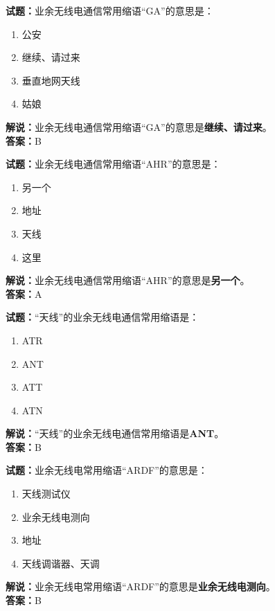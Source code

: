 \documentclass{ctexbook}
\begin{document}
\bigskip


\noindent\textbf{试题：}业余无线电通信常用缩语“GA”的意思是：
\begin{enumerate}[leftmargin=3em]
\item 公安
\item 继续、请过来
\item 垂直地网天线
\item 姑娘
\end{enumerate}
\noindent\textbf{解说：}业余无线电通信常用缩语“GA”的意思是\textbf{继续、请过来}。\\\noindent\textbf{答案：}B



\bigskip


\noindent\textbf{试题：}业余无线电通信常用缩语“AHR”的意思是：
\begin{enumerate}[leftmargin=3em]
\item 另一个
\item 地址
\item 天线
\item 这里
\end{enumerate}
\noindent\textbf{解说：}业余无线电通信常用缩语“AHR”的意思是\textbf{另一个}。\\\noindent\textbf{答案：}A

\bigskip


\noindent\textbf{试题：}“天线”的业余无线电通信常用缩语是：
\begin{enumerate}[leftmargin=3em]
\item ATR
\item ANT
\item ATT
\item ATN
\end{enumerate}
\noindent\textbf{解说：}“天线”的业余无线电通信常用缩语是\textbf{ANT}。\\\noindent\textbf{答案：}B



\bigskip


\noindent\textbf{试题：}业余无线电常用缩语“ARDF”的意思是：
\begin{enumerate}[leftmargin=3em]
\item 天线测试仪
\item 业余无线电测向
\item 地址
\item 天线调谐器、天调
\end{enumerate}
\noindent\textbf{解说：}业余无线电常用缩语“ARDF”的意思是\textbf{业余无线电测向}。\\\noindent\textbf{答案：}B
\end{document}
